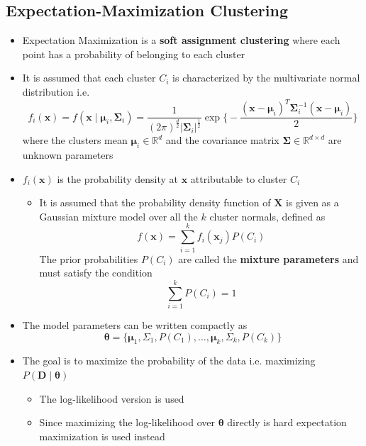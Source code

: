\documentclass[a4, english]{article}
\begin{document}
\subsection{Expectation-Maximization Clustering}
\begin{itemize}
	\item Expectation Maximization is a \textbf{soft assignment clustering} where each point has a probability of belonging to each cluster
  \item It is assumed that each cluster $C_i$ is characterized by the multivariate normal distribution i.e.
  \begin{equation*}
    f_i(\pmb x) = f(\pmb x \mid \pmb \mu_i, \pmb \Sigma_i) = \frac1{(2\pi)^{\frac d2}|\pmb \Sigma_i|^{\frac12}} \exp \bigg\{-\frac{(\pmb x- \pmb \mu_i)^T \pmb \Sigma_i^{-1}(\pmb x-\pmb  \mu_i)}2\bigg\}
  \end{equation*}
  where the clusters mean $\pmb \mu_i \in \mathbb R^d$ and the covariance matrix $\mathbf \Sigma \in \mathbb R^{d \times d}$ are unknown parameters
	\item $f_i(\pmb x)$ is the probability density at $\pmb x$ attributable to cluster $C_i$
  \begin{itemize}
	  \item It is assumed that the probability density function of $\mathbf X$ is given as a Gaussian mixture model over all the $k$ cluster normals, defined as 
  \begin{equation*}
    f(\pmb x) = \sum_{i=1}^k f_i(\pmb x_j) P(C_i)
  \end{equation*}
    The prior probabilities $P(C_i)$ are called the \textbf{mixture parameters} and must satisfy the condition 
  \begin{equation*}
    \sum_{i=1}^kP(C_i) = 1
  \end{equation*}
  \end{itemize}
  \item The model parameters can be written compactly as 
  \begin{equation*}
    \pmb \theta = \bigg\{\pmb \mu_1, \Sigma_1, P(C_1), \dots, \pmb \mu_k, \Sigma_k, P(C_k)\bigg\} 
  \end{equation*}
  \item The goal is to maximize the probability of the data i.e. maximizing $P(\pmb D \mid \pmb \theta)$ 
  \begin{itemize}
  	\item The log-likelihood version is used
    \item Since maximizing the log-likelihood over $\mathbf \theta$ directly is hard expectation maximization is used instead
  \end{itemize}
\end{itemize}
\newpage
\end{document}
